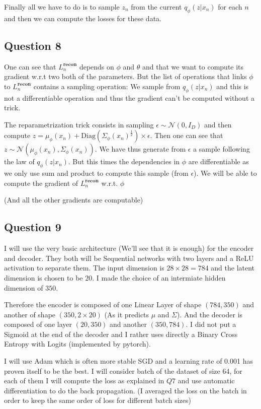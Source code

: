 \documentclass{article}
\begin{document}
Finally all we have to do is to sample $z_n$ from the current $q_\phi(z|x_n)$ for each $n$ and then we can compute the losses for these data.

\subsection*{Question 8}

One can see that $L_n^{\textbf{recon}}$ depends on $\phi$ and $\theta$ and that we want to compute its gradient w.r.t two both of the
parameters.
But the list of operations that links $\phi$ to $L_n^{\textbf{recon}}$ contains a sampling operation: We sample from $q_\phi(z | x_n)$ and
this is not a differentiable operation and thus the gradient can't be computed without a trick.

The reparametrization trick consists in sampling $\epsilon \sim \mathcal{N}(0, I_D)$ and then compute
$z = \mu_\phi(x_n) + \text{Diag}(\Sigma_\phi(x_n)^{\frac{1}{2}}) \times \epsilon$. Then one can see that $z \sim \mathcal{N}(\mu_\phi(x_n), \Sigma_\phi(x_n))$.
We have thus generate from $\epsilon$ a sample following the law of $q_\phi(z | x_n)$. But this times the dependencies in $\phi$ are differentiable
as we only use sum and product to compute this sample (from $\epsilon$). We will be able to compute the gradient of $L_n^{\textbf{recon}}$
w.r.t. $\phi$

(And all the other gradients are computable)

\subsection*{Question 9}
I will use the very basic architecture (We'll see that it is enough) for the encoder and decoder. They both will be Sequential networks
with two layers and a ReLU activation to separate them. The input dimension is $28 \times 28 = 784$ and the latent dimension is chosen
to be $20$. I made the choice of an intermiate hidden dimension of $350$.

Therefore the encoder is composed of one Linear Layer of shape $(784, 350)$ and another of shape $(350, 2 \times 20)$
(As it predicts $\mu$ and $\Sigma$). And the decoder is composed of one layer $(20, 350)$ and another $(350, 784)$.
I did not put a Sigmoid at the end of the decoder and I rather uses directly a Binary Cross Entropy with Logits (implemented by pytorch).

I will use Adam which is often more stable SGD and a learning rate of 0.001 has proven itself to be the best. I will
consider batch of the dataset of size 64, for each of them I will compute the loss as explained in $Q7$ and use automatic
differentiation to do the back propagation. (I averaged the loss on the batch in order to keep the same order of loss for different batch
sizes)
\end{document}
